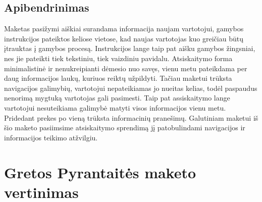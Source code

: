 \documentclass[oneside]{VUMIFPSkursinis}
\begin{document}
	\subsection{Apibendrinimas}
Maketas pasižymi aiškiai surandama informacija naujam vartotojui, gamybos instrukcijos pateiktos keliose vietose, kad naujas vartotojas kuo greičiau būtų įtrauktas į gamybos procesą. Instrukcijos lange taip pat aišku gamybos žingsniai, nes jie pateikti tiek tekstiniu, tiek vaizdiniu pavidalu. Atsiskaitymo forma minimalistinė ir nenukreipianti dėmesio nuo savęs, vienu metu pateikdama per daug informacijos laukų, kuriuos reiktų užpildyti. Tačiau maketui trūksta navigacijos galimybių, vartotojui nepateikiamas jo nueitas kelias, todėl paspaudus nenorimą mygtuką vartotojas gali pasimesti. Taip pat assiskaitymo lange vartotojui nesuteikiama galimybė matyti visos informacijos vienu metu. Pridedant prekes po vieną trūksta informacinių pranešimų. Galutiniam maketui iš šio maketo pasiimsime atsiskaitymo sprendimą jį patobulindami navigacijos ir informacijos teikimo atžvilgiu.
\iffalse XXXXXXXXXXXXXXXXXXXXXXXXXXXXXXXXXXXXXXXXXXXXXXXXXXXXXXXXXXXXXXXXXXXXXXXXXXXXXXXXXXXXXXXXXXXXXXXXXXXXXXXXXXXXXXXXXXXXXXXXXXXXXXXXXXXXXXX \fi
\section{Gretos Pyrantaitės maketo vertinimas}
\end{document}
